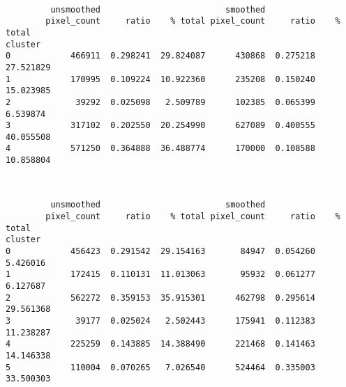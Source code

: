 \documentclass[11pt]{article}
\begin{document}
    
    \begin{center}
    \end{center}
    { \hspace*{\fill} \\}
    
    
    \begin{verbatim}
         unsmoothed                         smoothed                     
        pixel_count     ratio    % total pixel_count     ratio    % total
cluster                                                                  
0            466911  0.298241  29.824087      430868  0.275218  27.521829
1            170995  0.109224  10.922360      235208  0.150240  15.023985
2             39292  0.025098   2.509789      102385  0.065399   6.539874
3            317102  0.202550  20.254990      627089  0.400555  40.055508
4            571250  0.364888  36.488774      170000  0.108588  10.858804
    \end{verbatim}

    
    \begin{center}
    \end{center}
    { \hspace*{\fill} \\}
    
    
    \begin{verbatim}
         unsmoothed                         smoothed                     
        pixel_count     ratio    % total pixel_count     ratio    % total
cluster                                                                  
0            456423  0.291542  29.154163       84947  0.054260   5.426016
1            172415  0.110131  11.013063       95932  0.061277   6.127687
2            562272  0.359153  35.915301      462798  0.295614  29.561368
3             39177  0.025024   2.502443      175941  0.112383  11.238287
4            225259  0.143885  14.388490      221468  0.141463  14.146338
5            110004  0.070265   7.026540      524464  0.335003  33.500303
    \end{verbatim}

    
    \begin{center}
    \end{center}
    { \hspace*{\fill} \\}
    
\end{document}
